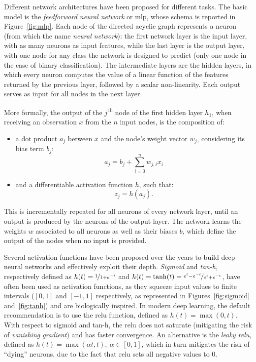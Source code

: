 \documentclass[%
    corpo=12pt,
    twoside,
    stile=classica,   
    tipotesi=magistrale,
    evenboxes,
    english,
	numerazioneromana,
]{toptesi}
\newcommand{\quotes}[1]{``#1''}
\begin{document}
\medskip
Different network architectures have been proposed for different tasks. The basic model is the \textit{feedforward neural network} or \gls{mlp}, whose schema is reported in Figure~\ref{fig:mlp}. Each node of the directed acyclic graph represents a neuron (from which the name \textit{neural network}): the first network layer is the input layer, with as many neurons as input features, while the last layer is the output layer, with one node for any class the network is designed to predict (only one node in the case of binary classification). The intermediate layers are the hidden layers, in which every neuron computes the value of a linear function of the features returned by the previous layer, followed by a scalar non-linearity. Each output serves as input for all nodes in the next layer.

\bigskip
More formally, the output of the $j$\textsuperscript{th} node of the first hidden layer $h_1$, when receiving an observation $x$ from the $n$ input nodes, is the composition of:
\begin{itemize}
	\item a dot product $a_j$ between $x$ and the node's weight vector $w_j$, considering its bias term $b_j$:
	\begin{equation*}
		a_j = b_j + \sum_{i=0}^n w_{j,i}x_i
	\end{equation*}
	\item and a differentiable activation function $h$, such that:
	\begin{equation*}
		z_j = h(a_j)\text{.}
	\end{equation*}
\end{itemize}
This is incrementally repeated for all neurons of every network layer, until an output is produced by the neurons of the output layer. The network learns the weights $w$ associated to all neurons as well as their biases $b$, which define the output of the nodes when no input is provided\cite{amini2015apprentissage}.

\bigskip
Several activation functions have been proposed over the years to build deep neural networks and effectively exploit their depth. \textit{Sigmoid} and \textit{tan-h}, respectively defined as $h(t) = \nicefrac{1}{1 + e^{-t}}$ and $h(t) = \tanh(t) = \nicefrac{e^t - e^{-t}}{e^t + e^{-t}}$, have often been used as activation functions, as they squeeze input values to finite intervals ($[0,1]$ and $[-1,1]$ respectively, as represented in Figures~\ref{fig:sigmoid} and~\ref{fig:tanh}) and are biologically inspired. In modern deep learning, the default recommendation is to use the \gls{relu} function, defined as $h(t) = \max(0,t)$. With respect to sigmoid and tan-h, the \gls{relu} does not saturate (mitigating the risk of \textit{vanishing gradient}) and has faster convergence. An alternative is the \textit{leaky \gls{relu}}, defined as $h(t) = \max(\alpha t, t),\ \alpha \in [0,1]$, which in turn mitigates the risk of \quotes{dying} neurons, due to the fact that \gls{relu} sets all negative values to $0$.
\end{document}

